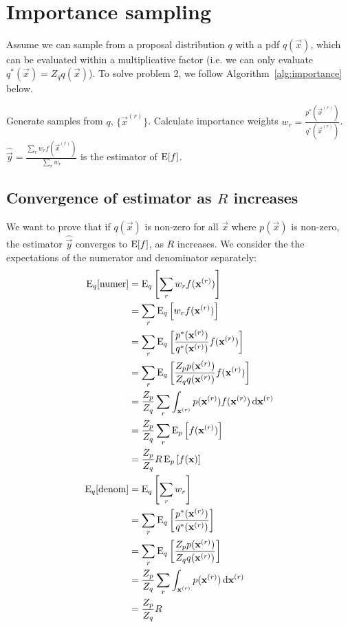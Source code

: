 \section{Importance sampling}

Assume we can sample from a proposal distribution $q$ with a pdf $q(\vec x)$, which can be evaluated within a multiplicative factor (i.e. we can only evaluate $q^\ast(\vec x) = Z_q q(\vec x)$). To solve problem 2, we follow Algorithm~\ref{alg:importance} below.
\begin{algorithmbis}\label{alg:importance}
    \begin{algorithmic}[1]
        \State Generate samples from $q$, $\{\vec x^{(r)}\}$.
        \State Calculate importance weights $w_r = \frac{p^\ast(\vec x^{(r)})}{q^\ast(\vec x^{(r)})}$.
        \State $\hat{\vec y} = \frac{\sum_r w_r f(\vec x^{(r)})}{\sum_r w_r}$ is the estimator of $\operatorname{\mathrm{E}}[f]$.
    \end{algorithmic}
\end{algorithmbis}

\subsection{Convergence of estimator as $R$ increases}
    We want to prove that if $q(\vec x)$ is non-zero for all $\vec x$ where $p(\vec x)$ is non-zero, the estimator $\hat{\vec y}$ converges to $\operatorname{\mathrm{E}}[f]$, as $R$ increases. We consider the the expectations of the numerator and denominator separately:
    \begin{align}
        \operatorname{\mathrm{E}}_q[\text{numer}]  &= \operatorname{\mathrm{E}}_q\left[\sum_r w_r f(\boldsymbol{\mathbf{x}}^{(r)})\right] \\
                            &= \sum_r \operatorname{\mathrm{E}}_q\left[w_r f(\boldsymbol{\mathbf{x}}^{(r)})\right] \\
                            &= \sum_r \operatorname{\mathrm{E}}_q\left[\frac{p^\ast(\boldsymbol{\mathbf{x}}^{(r)})}{q^\ast(\boldsymbol{\mathbf{x}}^{(r)})} f(\boldsymbol{\mathbf{x}}^{(r)})\right] \\
                            &= \sum_r \operatorname{\mathrm{E}}_q\left[\frac{Z_p p(\boldsymbol{\mathbf{x}}^{(r)})}{Z_q q(\boldsymbol{\mathbf{x}}^{(r)})} f(\boldsymbol{\mathbf{x}}^{(r)})\right] \\
                            &= \frac{Z_p}{Z_q} \sum_r \int_{\boldsymbol{\mathbf{x}}^{(r)}} p(\boldsymbol{\mathbf{x}}^{(r)}) f(\boldsymbol{\mathbf{x}}^{(r)}) \, \mathrm d \boldsymbol{\mathbf{x}}^{(r)} \\
                            &= \frac{Z_p}{Z_q} \sum_r \operatorname{\mathrm{E}}_p\left[f(\boldsymbol{\mathbf{x}}^{(r)})\right] \\
                            &= \frac{Z_p}{Z_q} R \operatorname{\mathrm{E}}_p\left[f(\boldsymbol{\mathbf{x}})\right] \\
        \operatorname{\mathrm{E}}_q[\text{denom}]  &= \operatorname{\mathrm{E}}_q\left[\sum_r w_r\right] \\
                            &= \sum_r \operatorname{\mathrm{E}}_q\left[\frac{p^\ast(\boldsymbol{\mathbf{x}}^{(r)})}{q^\ast(\boldsymbol{\mathbf{x}}^{(r)})}\right] \\
                            &= \sum_r \operatorname{\mathrm{E}}_q\left[\frac{Z_p p(\boldsymbol{\mathbf{x}}^{(r)})}{Z_q q(\boldsymbol{\mathbf{x}}^{(r)})}\right] \\
                            &= \frac{Z_p}{Z_q} \sum_r \int_{\boldsymbol{\mathbf{x}}^{(r)}} p(\boldsymbol{\mathbf{x}}^{(r)}) \,\mathrm d \boldsymbol{\mathbf{x}}^{(r)} \\
                            &= \frac{Z_p}{Z_q} R
    \end{align}

